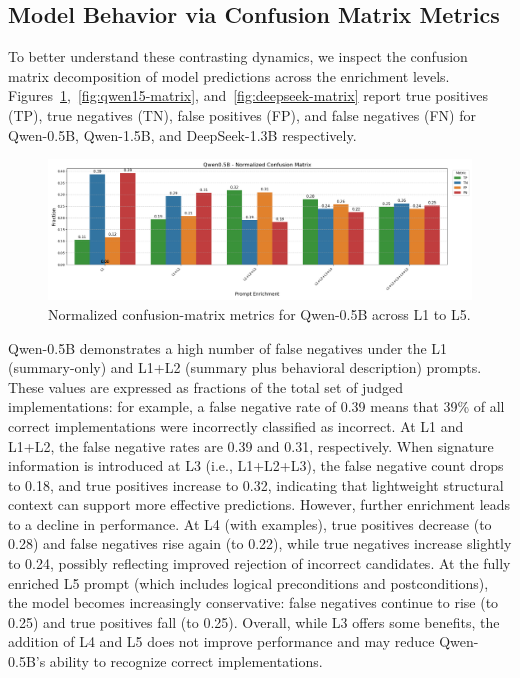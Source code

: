 \documentclass[a4paper]{usiinfbachelorproject}
\begin{document}
\subsection{Model Behavior via Confusion Matrix Metrics}
To better understand these contrasting dynamics, we inspect the confusion matrix decomposition of model predictions across the enrichment levels. Figures~\ref{fig:qwen05-matrix},~\ref{fig:qwen15-matrix}, and~\ref{fig:deepseek-matrix} report true positives (TP), true negatives (TN), false positives (FP), and false negatives (FN) for Qwen-0.5B, Qwen-1.5B, and DeepSeek-1.3B respectively.
\begin{figure}[H]\centering
  \includegraphics[width=\linewidth]{figures/Qwen0.5B_matrix.png}
  \caption{Normalized confusion-matrix metrics for Qwen-0.5B across L1 to L5.}
  \label{fig:qwen05-matrix}
\end{figure}
\noindent
Qwen-0.5B demonstrates a high number of false negatives under the L1 (summary-only) and L1+L2 (summary plus behavioral description) prompts. These values are expressed as fractions of the total set of judged implementations: for example, a false negative rate of 0.39 means that 39\% of all correct implementations were incorrectly classified as incorrect. At L1 and L1+L2, the false negative rates are 0.39 and 0.31, respectively. When signature information is introduced at L3 (i.e., L1+L2+L3), the false negative count drops to 0.18, and true positives increase to 0.32, indicating that lightweight structural context can support more effective predictions. However, further enrichment leads to a decline in performance. At L4 (with examples), true positives decrease (to 0.28) and false negatives rise again (to 0.22), while true negatives increase slightly to 0.24, possibly reflecting improved rejection of incorrect candidates. At the fully enriched L5 prompt (which includes logical preconditions and postconditions), the model becomes increasingly conservative: false negatives continue to rise (to 0.25) and true positives fall (to 0.25). Overall, while L3 offers some benefits, the addition of L4 and L5 does not improve performance and may reduce Qwen-0.5B’s ability to recognize correct implementations.
\end{document}

